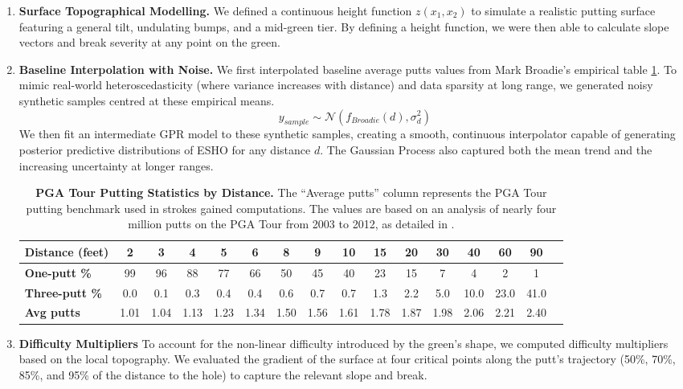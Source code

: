 \documentclass[11pt, letterpaper]{article}
\begin{document}
\begin{enumerate}
    \item \textbf{Surface Topographical Modelling.} We defined a continuous height function $z(x_1, x_2)$ to simulate a realistic putting surface featuring a general tilt, undulating bumps, and a mid-green tier. By defining a height function, we were then able to calculate slope vectors and break severity at any point on the green.
    \item \textbf{Baseline Interpolation with Noise.} We first interpolated baseline average putts values from Mark Broadie's empirical table \ref{tab: ESHO_Putts}. 
    To mimic real-world heteroscedasticity (where variance increases with distance) and data sparsity at long range, we generated noisy synthetic samples centred at these empirical means.
\[ y_{sample} \sim \mathcal{N}(f_{Broadie}(d), \sigma_d^2) \]
We then fit an intermediate GPR model to these synthetic samples, creating a smooth, continuous interpolator capable of generating posterior predictive distributions of ESHO for any distance $d$. The Gaussian Process also captured both the mean trend and the increasing uncertainty at longer ranges.
\begin{table}[h!]
    \centering
    \small
    \caption{\textbf{PGA Tour Putting Statistics by Distance.} The ``Average putts'' column represents the PGA Tour putting benchmark used in strokes gained computations. The values are based on an analysis of nearly four million putts on the PGA Tour from 2003 to 2012, as detailed in \parencite{Broadie_2014a}.}
    \label{tab: ESHO_Putts}
    \renewcommand{\arraystretch}{1.2}
\begin{tabular}{lccccccccccccccc}
\toprule
\textbf{Distance (feet)} & 2 & 3 & 4 & 5 & 6 & 8 & 9 & 10 & 15 & 20 & 30 & 40 & 60 & 90 \\
\midrule
\textbf{One-putt \%}   & 99 & 96 & 88 & 77 & 66  & 50 & 45 & 40 & 23 & 15 & 7 & 4  & 2 & 1 \\
\textbf{Three-putt \%} & 0.0 & 0.1 & 0.3 & 0.4 & 0.4  & 0.6 & 0.7 & 0.7 & 1.3 & 2.2 & 5.0 & 10.0 & 23.0 & 41.0 \\
\textbf{Avg putts}      & 1.01 & 1.04 & 1.13 & 1.23 & 1.34 & 1.50 & 1.56 & 1.61 & 1.78 & 1.87 & 1.98 & 2.06 & 2.21 & 2.40 \\
\bottomrule
\end{tabular}

\end{table}
\item \textbf{Difficulty Multipliers}
To account for the non-linear difficulty introduced by the green's shape, we computed difficulty multipliers based on the local topography. We evaluated the gradient of the surface at four critical points along the putt's trajectory (50\%, 70\%, 85\%, and 95\% of the distance to the hole) to capture the relevant slope and break.


\end{enumerate}
\end{document}
